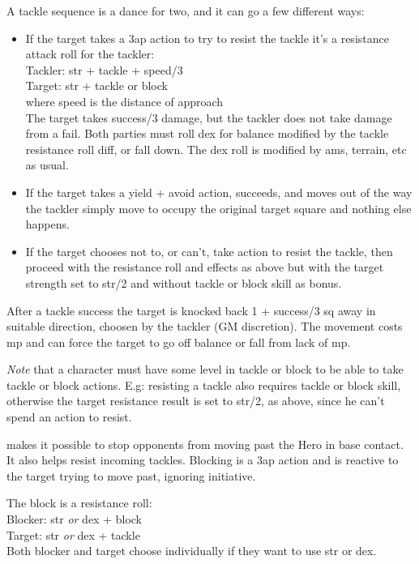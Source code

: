 A tackle sequence is a dance for two, and it can go a few different ways:
\begin{itemize}
    \item If the target takes a 3ap action to try to resist the tackle it's a resistance attack roll for the tackler:\\
    Tackler: str + tackle + speed/3 \\ 
    Target: str + tackle or block \\
    where speed is the distance of approach \\
    The target takes success/3 damage, but the tackler does not take damage from a fail. Both parties must roll dex for balance modified by the tackle resistance roll diff, or fall down. The dex roll is modified by ams, terrain, etc as usual.
    \item If the target takes a yield + avoid action, succeeds, and moves out of the way the tackler simply move to occupy the original target square and nothing else happens.
    \item If the target chooses not to, or can't, take action to resist the tackle, then proceed with the resistance roll and effects as above but with the target strength set to str/2 and without tackle or block skill as bonus.
\end{itemize}
After a tackle success the target is knocked back 1 + success/3 sq away in suitable direction, choosen by the tackler (GM discretion). The movement costs mp and can force the target to go off balance or fall from lack of mp.

\emph{Note} that a character must have some level in tackle or block to be able to take tackle or block actions. E.g: resisting a tackle also requires tackle or block skill, otherwise the target resistance result is set to str/2, as above, since he can't spend an action to resist.


 makes it possible to stop opponents from moving past the Hero in base contact. It also helps resist incoming tackles. Blocking is a 3ap action and is reactive to the target trying to move past, ignoring initiative.

The block is a resistance roll: \\
Blocker: str \emph{or} dex + block \\
Target: str \emph{or} dex + tackle \\
Both blocker and target choose individually if they want to use str or dex.

